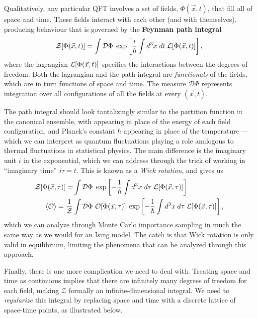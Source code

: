 Qualitatively, any particular QFT involves a set of fields, $\Phi(\vec x, t)$, that fill all of space and time.
These fields interact with each other (and with themselves), producing behaviour that is governed by the \textbf{Feynman path integral}
\begin{equation*}
  \mathcal Z[\Phi(\vec x, t)] = \int\mathcal D \Phi \; \exp\left[\frac{i}{\hbar} \int d^3x \; dt \; \mathcal L[\Phi(\vec x, t)]\right],
\end{equation*}
where the lagrangian $\mathcal L[\Phi(\vec x, t)]$ specifies the interactions between the degrees of freedom.
Both the lagrangian and the path integral are \textit{functionals} of the fields, which are in turn functions of space and time.
The measure $\mathcal D \Phi$ represents integration over all configurations of all the fields at every $(\vec x, t)$.

The path integral should look tantalizingly similar to the partition function in the canonical ensemble, with \cL appearing in place of the energy of each field configuration, and Planck's constant $\hbar$ appearing in place of the temperature --- which we can interpret as quantum fluctuations playing a role analogous to thermal fluctuations in statistical physics.
The main difference is the imaginary unit $i$ in the exponential, which we can address through the trick of working in ``imaginary time'' $i\tau = t$.
This is known as a \textit{Wick rotation}, and gives us
\begin{align*}
  \mathcal Z[\Phi(\vec x, \tau)] = & \int\mathcal D \Phi \; \exp\left[-\frac{1}{\hbar} \int d^3x \; d\tau \; \cL[\Phi(\vec x, \tau)]\right] \\
  \vev{\cO}  = \frac{1}{\mathcal Z} & \int\mathcal D \Phi \ \cO[\Phi(\vec x, \tau)] \; \exp\left[-\frac{1}{\hbar} \int d^3x \; d\tau \; \cL[\Phi(\vec x, \tau)]\right],
\end{align*}
which we can analyze through Monte Carlo importance sampling in much the same way as we would for an Ising model.
The catch is that Wick rotation is only valid in equilibrium, limiting the phenomena that can be analyzed through this approach.

Finally, there is one more complication we need to deal with.
Treating space and time as continuous implies that there are infinitely many degrees of freedom for each field, making $\mathcal Z$ formally an infinite-dimensional integral.
We need to \textit{regularize} this integral by replacing space and time with a discrete lattice of space-time points, as illustrated below.

